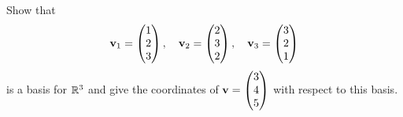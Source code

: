\documentclass[10pt, a4paper]{article}
\begin{document}
\begin{example}
    Show that 
    \[
    \mathbf{v}_1 = \begin{pmatrix}
        1 \\ 2 \\ 3
    \end{pmatrix},\quad\mathbf{v}_2 = \begin{pmatrix}
        2 \\ 3 \\ 2
    \end{pmatrix},\quad\mathbf{v}_3 = \begin{pmatrix}
        3 \\ 2 \\ 1
    \end{pmatrix}
    \]
    is a basis for $\mathbb{R} ^ 3$ and give the coordinates of $\mathbf{v} = \begin{pmatrix}
        3 \\ 4 \\ 5
    \end{pmatrix}$ with respect to this basis.


\end{example}
\end{document}

